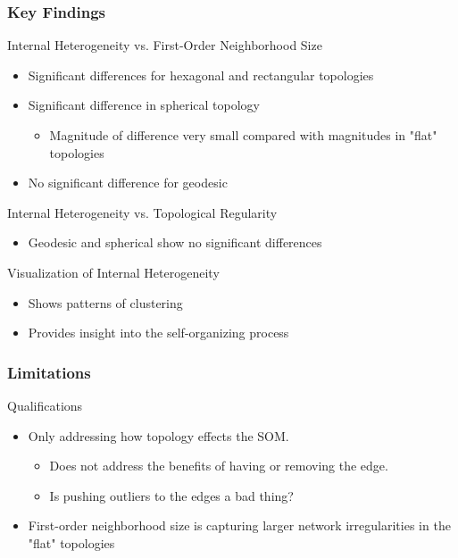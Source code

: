 \documentclass[nototal,handout]{beamer}
\begin{document}
\begin{frame}
	\frametitle{Key Findings}
 
\begin{block}{Internal Heterogeneity vs. First-Order Neighborhood Size}
 \begin{itemize}
 \item  Significant differences for hexagonal and rectangular topologies
 \item  Significant difference in spherical topology
 \begin{itemize}
 \item  Magnitude of difference very small compared with magnitudes in "flat" topologies
 \end{itemize}
 \item  No significant difference for geodesic
 \end{itemize}
 \end{block} 
\begin{block}{Internal Heterogeneity vs. Topological Regularity}
 \begin{itemize}
 \item  Geodesic and spherical show no significant differences
 \end{itemize}
 \end{block} 
\begin{block}{Visualization of Internal Heterogeneity}
 \begin{itemize}
 \item  Shows patterns of clustering
 \item  Provides insight into the self-organizing process
 \end{itemize}
 \end{block} \end{frame} 

\begin{frame}
	\frametitle{Limitations}
 
\begin{block}{Qualifications}
 \begin{itemize}
 \item  Only addressing how topology effects the SOM.
 \begin{itemize}
 \item  Does not address the benefits of having or removing the edge.
 \item  Is pushing outliers to the edges a bad thing?
 \end{itemize}
 \item  First-order neighborhood size is capturing larger network irregularities in the "flat" topologies
 \end{itemize}
 \end{block} \end{frame} 
\end{document}
